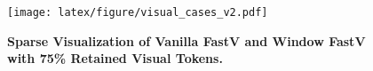 \begin{figure}[!ht]
    \vspace{-3mm}
    \centering
    \texttt{[image: latex/figure/visual\_cases\_v2.pdf]}
    \vspace{-6mm}
    \caption{\textbf{Sparse Visualization of Vanilla FastV and Window FastV with 75\% Retained Visual Tokens.}}
    \vspace{-3mm}
    \label{fig:intro_graph}
\end{figure}